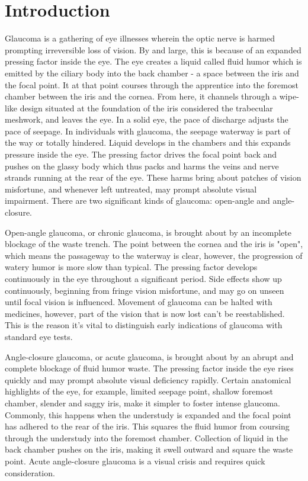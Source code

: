 \section{Introduction}
Glaucoma is a gathering of eye illnesses wherein the optic nerve is harmed prompting irreversible loss of vision. By and large, this is because of an expanded pressing factor inside the eye. The eye creates a liquid called fluid humor which is emitted by the ciliary body into the back chamber - a space between the iris and the focal point. It at that point courses through the apprentice into the foremost chamber between the iris and the cornea. From here, it channels through a wipe-like design situated at the foundation of the iris considered the trabecular meshwork, and leaves the eye. In a solid eye, the pace of discharge adjusts the pace of seepage. In individuals with glaucoma, the seepage waterway is part of the way or totally hindered. Liquid develops in the chambers and this expands pressure inside the eye. The pressing factor drives the focal point back and pushes on the glassy body which thus packs and harms the veins and nerve strands running at the rear of the eye. These harms bring about patches of vision misfortune, and whenever left untreated, may prompt absolute visual impairment. There are two significant kinds of glaucoma: open-angle and angle-closure.

\vspace{5mm}
Open-angle glaucoma, or chronic glaucoma, is brought about by an incomplete blockage of the waste trench. The point between the cornea and the iris is "open", which means the passageway to the waterway is clear, however, the progression of watery humor is more slow than typical. The pressing factor develops continuously in the eye throughout a significant period. Side effects show up continuously, beginning from fringe vision misfortune, and may go on unseen until focal vision is influenced. Movement of glaucoma can be halted with medicines, however, part of the vision that is now lost can't be reestablished. This is the reason it's vital to distinguish early indications of glaucoma with standard eye tests.

\vspace{5mm}
Angle-closure glaucoma, or acute glaucoma, is brought about by an abrupt and complete blockage of fluid humor waste. The pressing factor inside the eye rises quickly and may prompt absolute visual deficiency rapidly. Certain anatomical highlights of the eye, for example, limited seepage point, shallow foremost chamber, slender and saggy iris, make it simpler to foster intense glaucoma. Commonly, this happens when the understudy is expanded and the focal point has adhered to the rear of the iris. This squares the fluid humor from coursing through the understudy into the foremost chamber. Collection of liquid in the back chamber pushes on the iris, making it swell outward and square the waste point. Acute angle-closure glaucoma is a visual crisis and requires quick consideration.

